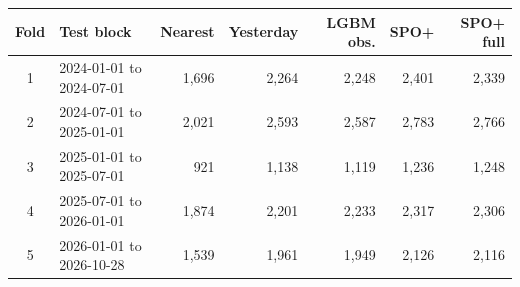 \renewcommand{\arraystretch}{1.25}
\footnotesize
\begin{tabular}{|c|l|r|r|r|r|r|}
\hline
\textbf{Fold} & \textbf{Test block} & \textbf{Nearest} & \textbf{Yesterday} & \textbf{LGBM obs.} & \textbf{SPO+} & \textbf{SPO+ full} \\
\hline
1 & 2024-01-01 to 2024-07-01 & 1,696 & 2,264 & 2,248 & 2,401 & 2,339 \\
\hline
2 & 2024-07-01 to 2025-01-01 & 2,021 & 2,593 & 2,587 & 2,783 & 2,766 \\
\hline
3 & 2025-01-01 to 2025-07-01 & 921 & 1,138 & 1,119 & 1,236 & 1,248 \\
\hline
4 & 2025-07-01 to 2026-01-01 & 1,874 & 2,201 & 2,233 & 2,317 & 2,306 \\
\hline
5 & 2026-01-01 to 2026-10-28 & 1,539 & 1,961 & 1,949 & 2,126 & 2,116 \\
\hline
\end{tabular}
